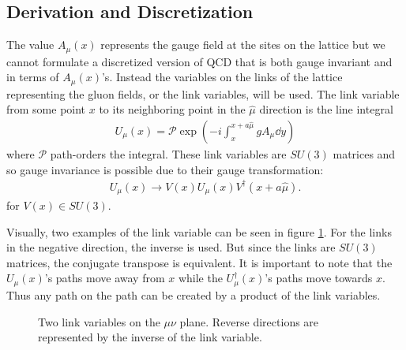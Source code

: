 \documentclass[11pt]{article}
\begin{document}
\subsection{Derivation and Discretization}
The value $A_\mu(x)$ represents the gauge field at the sites on the lattice but we cannot formulate a discretized version of QCD that is both gauge invariant and in terms of $A_\mu(x)$'s. Instead the variables on the links of the lattice representing the gluon fields, or the link variables, will be used. The link variable from some point $x$ to its neighboring point in the $\hat{\mu}$ direction is the line integral
\begin{align}
	U_\mu(x)=\mathcal{P}\exp\left(-i\int_x^{x+a\hat{\mu}}gA_\mu\dd{y}\right)
\end{align}
where $\mathcal{P}$ path-orders the integral. These link variables are $SU(3)$ matrices and so gauge invariance is possible due to their gauge transformation:
\begin{align}
	U_\mu(x)\to V(x)U_\mu(x)V^\dagger(x+a\hat{\mu}).
\end{align}
for $V(x)\in SU(3)$.

Visually, two examples of the link variable can be seen in figure \ref{fig:LinkVar}. For the links in the negative direction, the inverse is used. But since the links are $SU(3)$ matrices, the conjugate transpose is equivalent. It is important to note that the $U_\mu(x)$'s paths move away from $x$ while the $U^\dagger_\mu(x)$'s paths move towards $x$. Thus any path on the path can be created by a product of the link variables.
\begin{figure}[h]
\centering
{}
\caption{Two link variables on the $\mu\nu$ plane. Reverse directions are represented by the inverse of the link variable.} \label{fig:LinkVar}
\end{figure}
\end{document}
